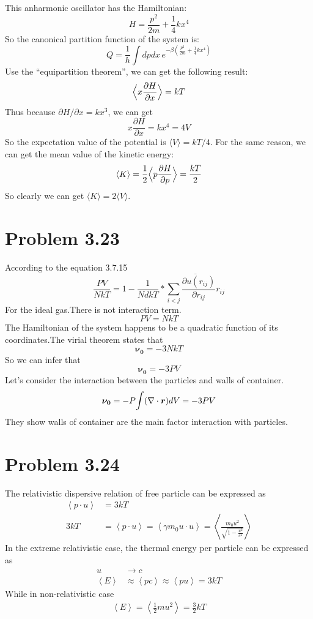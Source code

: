 \documentclass{article}
\begin{document}
	This anharmonic oscillator has the Hamiltonian:
	$$
	H = \frac{p^2}{2m} + \frac{1}{4}kx^4
	$$
	So the canonical partition function of the system is:
	\begin{equation}
	Q = \frac{1}{h}\int dpdx\,e^{-\beta\left(\frac{p^2}{2m} + \frac{1}{4}kx^4\right) }
	\end{equation}
	Use the ``equipartition theorem'', we can get the following result:
	\begin{equation}
	\Big{\langle} x \frac{\partial H}{\partial x}\Big{\rangle} =kT
	\end{equation}
	Thus because $\partial H/\partial x = kx^3$, we can get
	$$
	x\frac{\partial H}{\partial x} = kx^4 = 4V
	$$
	So the expectation value of the potential is $\langle V\rangle = kT/4$. For the same reason, we can get the mean value of the kinetic energy:
	\begin{equation}
	\langle K\rangle = \frac{1}{2}\Big{\langle} p\frac{\partial H}{\partial p}\Big{\rangle} = \frac{kT}{2}
	\end{equation}
	So clearly we can get $\langle K\rangle = 2\langle V\rangle$.
	

\section*{Problem 3.23} %
\label{sec:problem_3_23}
	According to the equation 3.7.15
	$$
	\frac{PV}{NkT}=1-\frac{1}{NdkT}*\overline{\sum_{i<j}\frac{\partial{u(r_{ij})}}{\partial{r_{ij}}}r_{ij}}
	$$
	For the ideal gas.There is not interaction term.
	$$
	PV=NkT
	$$
	The Hamiltonian of the system happens to be a quadratic function of its coordinates.The virial theorem states that
	$$
	\boldsymbol{\nu_0}=-3NkT
	$$
	So we can infer that
	$$
	\boldsymbol{\nu_0}=-3PV
	$$
	Let's consider the interaction between the particles and walls of container.
	$$
	\boldsymbol{\nu_0}=-P\mathlarger{\int}(\nabla\cdot\boldsymbol{ r})dV=-3PV
	$$
	They show walls of container are the main factor interaction with particles.

\section*{Problem 3.24}
	The relativistic dispersive relation of free particle can be expressed as
	\begin{align}
		\left\langle p\cdot u \right\rangle &=3kT\\
		3kT&=\left\langle p\cdot u \right\rangle =\left\langle\gamma m_0u \cdot u \right\rangle =\left\langle\frac{m_0u^2}{\sqrt{1-\frac{u^2}{c^2}}} \right\rangle 
	\end{align}
	In the extreme relativistic case, the thermal energy per particle can be expressed as
	\begin{align}
		u&\rightarrow c\\
		\left\langle E \right\rangle & \approx \left\langle pc \right\rangle \approx \left\langle pu\right\rangle=3kT
	\end{align}
	While in non-relativistic case
	\begin{align}
		\left\langle E\right\rangle=\left\langle\frac{1}{2}mu^2\right\rangle=\frac{3}{2}kT
	\end{align}
\end{document}
